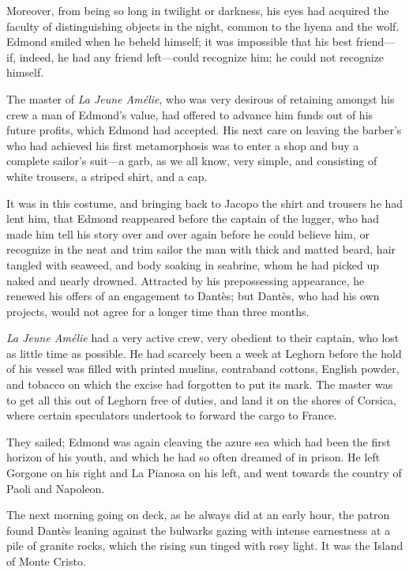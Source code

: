 Moreover, from being so long in twilight or darkness, his eyes had
acquired the faculty of distinguishing objects in the night, common to
the hyena and the wolf. Edmond smiled when he beheld himself; it was
impossible that his best friend—if, indeed, he had any friend
left—could recognize him; he could not recognize himself.

The master of \textit{La Jeune Amélie}, who was very desirous of retaining
amongst his crew a man of Edmond’s value, had offered to advance him
funds out of his future profits, which Edmond had accepted. His next
care on leaving the barber’s who had achieved his first metamorphosis
was to enter a shop and buy a complete sailor’s suit—a garb, as we all
know, very simple, and consisting of white trousers, a striped shirt,
and a cap.

It was in this costume, and bringing back to Jacopo the shirt and
trousers he had lent him, that Edmond reappeared before the captain of
the lugger, who had made him tell his story over and over again before
he could believe him, or recognize in the neat and trim sailor the man
with thick and matted beard, hair tangled with seaweed, and body
soaking in seabrine, whom he had picked up naked and nearly drowned.
Attracted by his prepossessing appearance, he renewed his offers of an
engagement to Dantès; but Dantès, who had his own projects, would not
agree for a longer time than three months.

\textit{La Jeune Amélie} had a very active crew, very obedient to their
captain, who lost as little time as possible. He had scarcely been a
week at Leghorn before the hold of his vessel was filled with printed
muslins, contraband cottons, English powder, and tobacco on which the
excise had forgotten to put its mark. The master was to get all this
out of Leghorn free of duties, and land it on the shores of Corsica,
where certain speculators undertook to forward the cargo to France.

They sailed; Edmond was again cleaving the azure sea which had been the
first horizon of his youth, and which he had so often dreamed of in
prison. He left Gorgone on his right and La Pianosa on his left, and
went towards the country of Paoli and Napoleon.

The next morning going on deck, as he always did at an early hour, the
patron found Dantès leaning against the bulwarks gazing with intense
earnestness at a pile of granite rocks, which the rising sun tinged
with rosy light. It was the Island of Monte Cristo.

